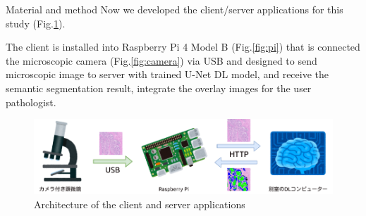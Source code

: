 \documentclass[
  dvipdfmx,
  xcolor={svgnames},
  hyperref={colorlinks,citecolor=DeepPink4,linkcolor=DarkRed,urlcolor=DarkBlue}
  ]{beamer}
\begin{document}
\begin{frame}{Material and method}
  Now we developed the client/server applications for this study (Fig.\ref{fig:arch}).
  \par
  \vspace{0.5zh}
  The client is installed into Raspberry Pi 4 Model B (Fig.\ref{fig:pi}) that is connected the microscopic camera (Fig.\ref{fig:camera}) via USB and designed to send microscopic image to server with trained U-Net DL model, and receive the semantic segmentation result, integrate the overlay images for the user pathologist.
  \begin{figure}\centering
    \includegraphics[width=0.8\columnwidth]{assets/arch.png}
    \caption{Architecture of the client and server applications}
    \label{fig:arch}
  \end{figure}
\end{frame}
\end{document}
